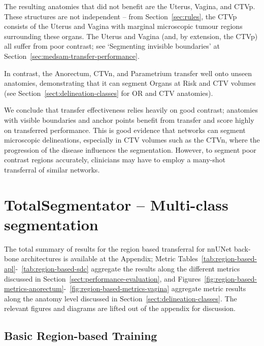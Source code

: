 \documentclass[11pt,twoside]{report}
\begin{document}
The resulting anatomies that did not benefit are the Uterus, Vagina, and CTVp. These structures are not independent -- from Section~\ref{sec:rules}, the CTVp consists of the Uterus and Vagina with marginal microscopic tumour regions surrounding these organs. The Uterus and Vagina (and, by extension, the CTVp) all suffer from poor contrast; see `Segmenting invisible boundaries' at Section~\ref{sec:medsam-transfer-performance}. 

In contrast, the Anorectum, CTVn, and Parametrium transfer well onto unseen anatomies, demonstrating that it can segment Organs at Risk and CTV volumes (see Section~\ref{sect:delineation-classes} for OR and CTV anatomies).

We conclude that transfer effectiveness relies heavily on good contrast; anatomies with visible boundaries and anchor points benefit from transfer and score highly on transferred performance. This is good evidence that networks can segment microscopic delineations, especially in CTV volumes such as the CTVn, where the progression of the disease influences the segmentation. However, to segment poor contrast regions accurately, clinicians may have to employ a many-shot transferral of similar networks.

\section{TotalSegmentator -- Multi-class segmentation}

The total summary of results for the region based transferral for nnUNet back-bone architectures is available at the Appendix; Metric Tables~\ref{tab:region-based-apl}-~\ref{tab:region-based-sdc} aggregate the results along the different metrics discussed in Section~\ref{sect:performance-evaluation}, and Figures~\ref{fig:region-based-metrics-anorectum}-~\ref{fig:region-based-metrics-vagina} aggregate metric results along the anatomy level discussed in Section~\ref{sect:delineation-classes}. The relevant figures and diagrams are lifted out of the appendix for discussion.

\subsection{Basic Region-based Training}

\end{document}
